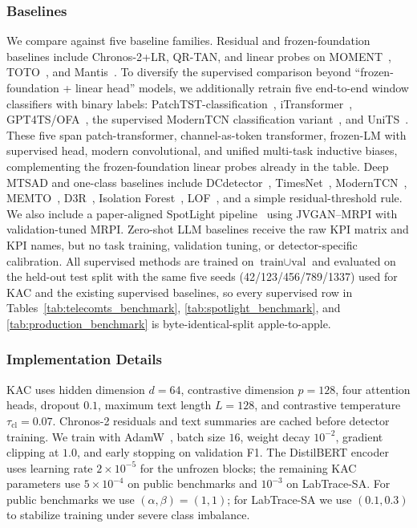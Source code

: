 \documentclass[conference]{IEEEtran}
\begin{document}
\subsubsection{Baselines}
\label{sec:baselines}

We compare against five baseline families. Residual and frozen-foundation baselines include Chronos-2+LR, QR-TAN, and linear probes on MOMENT~\cite{goswami2024moment}, TOTO~\cite{cohen2025toto}, and Mantis~\cite{feofanov2025mantis}. To diversify the supervised comparison beyond ``frozen-foundation + linear head'' models, we additionally retrain five end-to-end window classifiers with binary labels: PatchTST-classification~\cite{nie2023patchtst}, iTransformer~\cite{liu2024itransformer}, GPT4TS/OFA~\cite{zhou2023gpt4ts}, the supervised ModernTCN classification variant~\cite{luo2024moderntcn}, and UniTS~\cite{gao2024units}. These five span patch-transformer, channel-as-token transformer, frozen-LM with supervised head, modern convolutional, and unified multi-task inductive biases, complementing the frozen-foundation linear probes already in the table. Deep MTSAD and one-class baselines include DCdetector~\cite{yang2023dcdetector}, TimesNet~\cite{wu2023timesnet}, ModernTCN~\cite{luo2024moderntcn}, MEMTO~\cite{song2023memto}, D3R~\cite{wang2023d3r}, Isolation Forest~\cite{liu2008isolation}, LOF~\cite{breunig2000lof}, and a simple residual-threshold rule. We also include a paper-aligned SpotLight pipeline~\cite{sun2024spotlight} using JVGAN--MRPI with validation-tuned MRPI. Zero-shot LLM baselines receive the raw KPI matrix and KPI names, but no task training, validation tuning, or detector-specific calibration. All supervised methods are trained on \(\text{train} \cup \text{val}\) and evaluated on the held-out test split with the same five seeds (42/123/456/789/1337) used for KAC and the existing supervised baselines, so every supervised row in Tables~\ref{tab:telecomts_benchmark}, \ref{tab:spotlight_benchmark}, and \ref{tab:production_benchmark} is byte-identical-split apple-to-apple.

\subsubsection{Implementation Details}
\label{sec:impl}

KAC uses hidden dimension $d=64$, contrastive dimension $p=128$, four attention heads, dropout $0.1$, maximum text length $L=128$, and contrastive temperature $\tau_{\mathrm{cl}}=0.07$. Chronos-2 residuals and text summaries are cached before detector training. We train with AdamW~\cite{loshchilov2019adamw}, batch size $16$, weight decay $10^{-2}$, gradient clipping at $1.0$, and early stopping on validation F1. The DistilBERT encoder uses learning rate $2{\times}10^{-5}$ for the unfrozen blocks; the remaining KAC parameters use $5{\times}10^{-4}$ on public benchmarks and $10^{-3}$ on LabTrace-SA. For public benchmarks we use $(\alpha,\beta)=(1,1)$; for LabTrace-SA we use $(0.1,0.3)$ to stabilize training under severe class imbalance.
\end{document}
